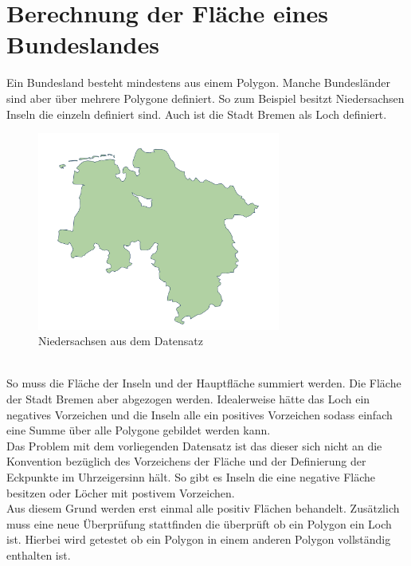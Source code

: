 \documentclass[conference]{IEEEtran}
\begin{document}
	
	\section{Berechnung der Fläche eines Bundeslandes}
	Ein Bundesland besteht mindestens aus einem Polygon. Manche Bundesländer sind aber über mehrere Polygone definiert. So zum Beispiel besitzt Niedersachsen Inseln die einzeln definiert sind. Auch ist die Stadt Bremen als Loch definiert. 
	\begin{figure}[h]
		\begin{center}
			\includegraphics[width=8cm]{Niedersachsen.png}
			\caption{Niedersachsen aus dem Datensatz}
			\label{Niedersachsen}
		\end{center}
	\end{figure}\\
	So muss die Fläche der Inseln und der Hauptfläche summiert werden. Die Fläche der Stadt Bremen aber abgezogen werden. Idealerweise hätte das Loch ein negatives Vorzeichen und die Inseln alle ein positives Vorzeichen sodass einfach eine Summe über alle Polygone gebildet werden kann.\\
	Das Problem mit dem vorliegenden Datensatz ist das dieser sich nicht an die Konvention bezüglich des Vorzeichens der Fläche und der Definierung der Eckpunkte im Uhrzeigersinn hält. So gibt es Inseln die eine negative Fläche besitzen oder Löcher mit postivem Vorzeichen.\\
	Aus diesem Grund werden erst einmal alle positiv Flächen behandelt. Zusätzlich muss eine neue Überprüfung stattfinden die überprüft ob ein Polygon ein Loch ist. Hierbei wird getestet ob ein Polygon in einem anderen Polygon vollständig enthalten ist.
\end{document}
